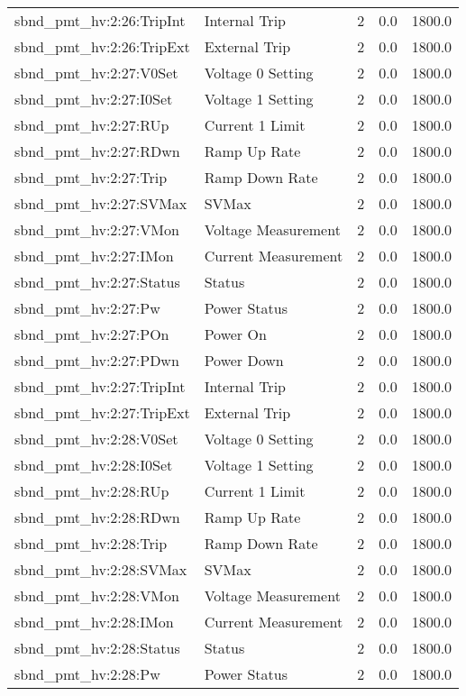 \begin{center}
\begin{longtable}{l | l l l l }
sbnd\_pmt\_hv:2:26:TripInt & Internal Trip & 2 & 0.0 & 1800.0\\ 
sbnd\_pmt\_hv:2:26:TripExt & External Trip & 2 & 0.0 & 1800.0\\ 
sbnd\_pmt\_hv:2:27:V0Set & Voltage 0 Setting & 2 & 0.0 & 1800.0\\ 
sbnd\_pmt\_hv:2:27:I0Set & Voltage 1 Setting & 2 & 0.0 & 1800.0\\ 
sbnd\_pmt\_hv:2:27:RUp & Current 1 Limit & 2 & 0.0 & 1800.0\\ 
sbnd\_pmt\_hv:2:27:RDwn & Ramp Up Rate & 2 & 0.0 & 1800.0\\ 
sbnd\_pmt\_hv:2:27:Trip & Ramp Down Rate & 2 & 0.0 & 1800.0\\ 
sbnd\_pmt\_hv:2:27:SVMax & SVMax & 2 & 0.0 & 1800.0\\ 
sbnd\_pmt\_hv:2:27:VMon & Voltage Measurement & 2 & 0.0 & 1800.0\\ 
sbnd\_pmt\_hv:2:27:IMon & Current Measurement & 2 & 0.0 & 1800.0\\ 
sbnd\_pmt\_hv:2:27:Status & Status & 2 & 0.0 & 1800.0\\ 
sbnd\_pmt\_hv:2:27:Pw & Power Status & 2 & 0.0 & 1800.0\\ 
sbnd\_pmt\_hv:2:27:POn & Power On & 2 & 0.0 & 1800.0\\ 
sbnd\_pmt\_hv:2:27:PDwn & Power Down & 2 & 0.0 & 1800.0\\ 
sbnd\_pmt\_hv:2:27:TripInt & Internal Trip & 2 & 0.0 & 1800.0\\ 
sbnd\_pmt\_hv:2:27:TripExt & External Trip & 2 & 0.0 & 1800.0\\ 
sbnd\_pmt\_hv:2:28:V0Set & Voltage 0 Setting & 2 & 0.0 & 1800.0\\ 
sbnd\_pmt\_hv:2:28:I0Set & Voltage 1 Setting & 2 & 0.0 & 1800.0\\ 
sbnd\_pmt\_hv:2:28:RUp & Current 1 Limit & 2 & 0.0 & 1800.0\\ 
sbnd\_pmt\_hv:2:28:RDwn & Ramp Up Rate & 2 & 0.0 & 1800.0\\ 
sbnd\_pmt\_hv:2:28:Trip & Ramp Down Rate & 2 & 0.0 & 1800.0\\ 
sbnd\_pmt\_hv:2:28:SVMax & SVMax & 2 & 0.0 & 1800.0\\ 
sbnd\_pmt\_hv:2:28:VMon & Voltage Measurement & 2 & 0.0 & 1800.0\\ 
sbnd\_pmt\_hv:2:28:IMon & Current Measurement & 2 & 0.0 & 1800.0\\ 
sbnd\_pmt\_hv:2:28:Status & Status & 2 & 0.0 & 1800.0\\ 
sbnd\_pmt\_hv:2:28:Pw & Power Status & 2 & 0.0 & 1800.0\\ 

\end{longtable}
\end{center}

